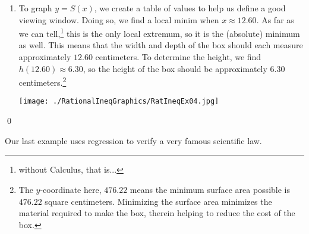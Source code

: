 \documentclass{ximera}
\begin{document}
\begin{example}
\begin{enumerate}
\item   To graph $y = S(x)$, we create a table of values to help us define a good viewing window.  Doing so, we find a local minim when $x \approx 12.60$.  As far as we can tell,\footnote{without Calculus, that is...} this is the only local extremum, so it is the (absolute) minimum as well. This means that the width and depth of the box should each measure approximately $12.60$ centimeters.  To determine the height, we find $h(12.60) \approx 6.30$, so the height of the box should be approximately $6.30$ centimeters.\footnote{The $y$-coordinate here, $476.22$ means the minimum surface area possible is $476.22$ square centimeters.  Minimizing the surface area minimizes the material required to make the box, therein helping to reduce the cost of the box.}

\begin{center}


\texttt{[image: ./RationalIneqGraphics/RatIneqEx04.jpg]} 


\end{center} 

\end{enumerate}
\qed

\end{example}

Our last example uses regression to verify a very famous scientific law.
\end{document}
